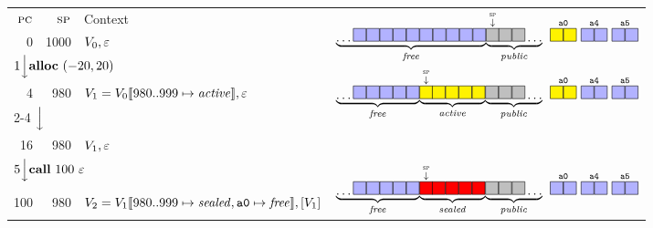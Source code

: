 \documentclass[10pt,conference]{ieeetran}%
\theoremstyle{definition}
\begin{document}
\begin{figure*}
  \begin{tabular}{|r|r||l|r}
    \cline{1-3}
    \(\textsc{pc}\) & \(\textsc{sp}\) & Context &
    \multirow{3}{*}{\(\underbrace{\dots \freebox \freebox \freebox \freebox \freebox
        \freebox \freebox \freebox \freebox \freebox}_\unsealed
      \! \underbrace{\stackrel{\stackrel{\SP}{\downarrow}}{\pubbox} \!\! \pubbox \pubbox \dots}_\public
      ~ \stackrel{\mathtt{a0}}{\objbox\objbox} ~ \stackrel{\mathtt{a4}}{\freebox\freebox}
      ~ \stackrel{\mathtt{a5}}{\freebox\freebox}
      \)} \\
    \cline{1-3}
    0 & 1000 & \(V_0, \varepsilon\)
    \\
    \cline{1-3}
    \multicolumn{3}{l}{\multirow{2}{*}{\(1 \Big\downarrow \mathbf{alloc} ~ (-20,20)\)}} & \\
    \multicolumn{3}{l}{} &
    \multirow{3}{*}{\(\underbrace{\dots \freebox \freebox \freebox \freebox \freebox}_\unsealed
      \! \underbrace{\stackrel{\stackrel{\SP}{\downarrow}}{\objbox} \!\! \objbox \objbox \objbox \objbox}_\object
      \! \underbrace{\pubbox \pubbox \pubbox \dots}_\public
      ~ \stackrel{\mathtt{a0}}{\objbox\objbox} ~ \stackrel{\mathtt{a4}}{\freebox\freebox}
      ~ \stackrel{\mathtt{a5}}{\freebox\freebox}
      \)}
    \\
    \cline{1-3}
    4 & 980 & \(V_1 = V_0 \llbracket 980..999 \mapsto \mathit{active}\rrbracket, \varepsilon\) &
    \\
    \cline{1-3}
    \multicolumn{3}{l}{\multirow{2}{*}{2-4 \(\Big\downarrow\)}} \\ \multicolumn{3}{l}{} \\
    \cline{1-3}
    16 & 980 & \(V_1, \varepsilon\) & \\
    \cline{1-3}
    \multicolumn{3}{l}{\multirow{2}{*}{\(5 \Big\downarrow \mathbf{call} ~ 100 ~ \varepsilon\)}} & \\
    \multicolumn{3}{l}{} &
    \multirow{3}{*}{\(\underbrace{\dots \freebox \freebox \freebox \freebox \freebox}_\unsealed
      \! \underbrace{\stackrel{\stackrel{\SP}{\downarrow}}{\sealbox} \!\! \sealbox \sealbox \sealbox \sealbox}_\sealed
      \! \underbrace{\pubbox \pubbox \pubbox \dots}_\public
      ~ \stackrel{\mathtt{a0}}{\freebox\freebox} ~ \stackrel{\mathtt{a4}}{\freebox\freebox}
      ~ \stackrel{\mathtt{a5}}{\freebox\freebox}
      \)}
    \\
    \cline{1-3}
    100 & 980 & \(V_2 = V_1 \llbracket 980..999 \mapsto \mathit{sealed}, \mathtt{a0} \mapsto \mathit{free}\rrbracket,[V_1]\) & \\

\end{tabular}
\end{figure*}
\end{document}
